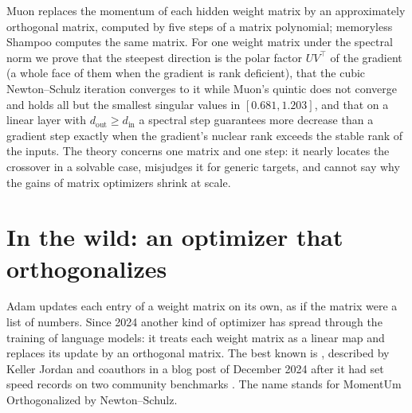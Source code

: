\newcommand{\spectralrnuc}{r_{\mathrm{nuc}}}
\newcommand{\spectralrst}{r_{\mathrm{st}}}

\begin{refsection}

\begin{chaptersummary}
Muon replaces the momentum of each hidden weight matrix by an approximately orthogonal matrix, computed by five steps of a matrix polynomial; memoryless Shampoo computes the same matrix. For one weight matrix under the spectral norm we prove that the steepest direction is the polar factor $UV^\top$ of the gradient (a whole face of them when the gradient is rank deficient), that the cubic Newton--Schulz iteration converges to it while Muon's quintic does not converge and holds all but the smallest singular values in $[0.681,1.203]$, and that on a linear layer with $d_{\mathrm{out}}\ge d_{\mathrm{in}}$ a spectral step guarantees more decrease than a gradient step exactly when the gradient's nuclear rank exceeds the stable rank of the inputs. The theory concerns one matrix and one step: it nearly locates the crossover in a solvable case, misjudges it for generic targets, and cannot say why the gains of matrix optimizers shrink at scale.
\end{chaptersummary}

\section{In the wild: an optimizer that orthogonalizes}\label{sec:spectral:wild}

Adam updates each entry of a weight matrix on its own, as if the matrix were a list of numbers. Since 2024 another kind of optimizer has spread through the training of language models: it treats each weight matrix as a linear map and replaces its update by an orthogonal matrix. The best known is , described by Keller Jordan and coauthors in a blog post of December 2024 after it had set speed records on two community benchmarks \parencite{JordanEtAl2024Muon}. The name stands for MomentUm Orthogonalized by Newton--Schulz.


\end{refsection}
